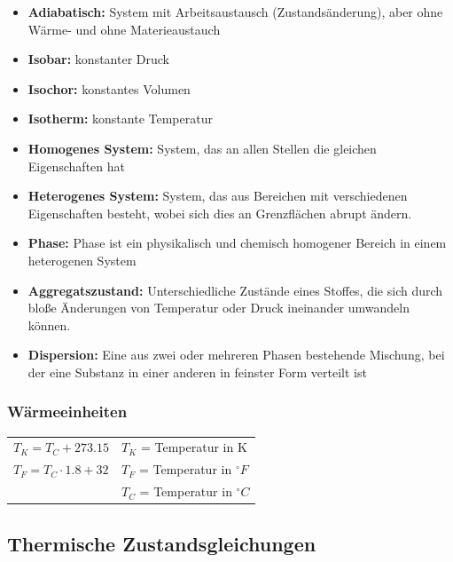 \begin{minipage}{18cm}
\begin{itemize}
				\item \textbf{Adiabatisch:} System mit Arbeitsaustausch (Zustandsänderung), aber ohne Wärme- und ohne Materieaustauch
				\item \textbf{Isobar:} konstanter Druck
				\item \textbf{Isochor:} konstantes Volumen
				\item \textbf{Isotherm:} konstante Temperatur
				\item \textbf{Homogenes System:} System, das an allen Stellen die gleichen Eigenschaften hat
				\item \textbf{Heterogenes System:} System, das aus Bereichen mit verschiedenen Eigenschaften besteht, wobei sich dies an Grenzflächen abrupt ändern.
				\item \textbf{Phase:} Phase ist ein physikalisch und chemisch homogener Bereich in einem heterogenen System
				\item  \textbf{Aggregatszustand:} Unterschiedliche Zustände eines Stoffes, die sich durch bloße Änderungen von Temperatur oder Druck ineinander umwandeln können.
				\item \textbf{Dispersion:} Eine aus zwei oder mehreren Phasen bestehende Mischung, bei der eine Substanz in einer anderen in feinster Form verteilt ist
			\end{itemize}
		\end{minipage}

	\subsubsection{Wärmeeinheiten}
		\begin{minipage}{14cm}
			\begin{tabular}{ p{4cm} | p{6cm} }
				$T_K = T_C + 273.15$
				& $T_K$ = Temperatur in K\\
				$T_F = T_C \cdot 1.8 + 32$
				& $T_F$ = Temperatur in $^\circ F$\\
				& $T_C$ = Temperatur in $^\circ C$
			\end{tabular} 
		\end{minipage}
	
	\subsection{Thermische Zustandsgleichungen}
